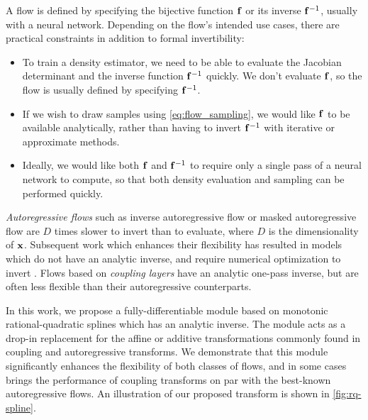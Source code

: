 A flow is defined by specifying the bijective function $\mathbf{f}$ or its inverse $\mathbf{f}^{-1}$, usually with a neural network. Depending on the flow's intended use cases, there are practical constraints in addition to formal invertibility:
\begin{itemize}[leftmargin=*, topsep=0pt, itemsep=0pt]
    \item To train a density estimator, we need to be able to evaluate the Jacobian determinant and the inverse function $\mathbf{f}^{-1}$ quickly. We don't evaluate $\mathbf{f}$, so the flow is usually defined by specifying $\mathbf{f}^{-1}$.
    \item If we wish to draw samples using \cref{eq:flow_sampling}, we would like $\mathbf{f}$ to be available analytically, rather than having to invert $\mathbf{f}^{-1}$ with iterative or approximate methods.
    \item Ideally, we would like both $ \mathbf{f} $ and $ \mathbf{f}^{-1} $ to require only a single pass of a neural network to compute, so that both density evaluation and sampling can be performed quickly.
\end{itemize}
\emph{Autoregressive flows} such as inverse autoregressive flow \citep[IAF,][]{Kingma:2016:iaf} or masked autoregressive flow \citep[MAF,][]{Papamakarios:2017:maf} are $ D $ times slower to invert than to evaluate, where $ D $ is the dimensionality of $ \mathbf{x} $.
Subsequent work which enhances their flexibility has resulted in models which do not have an analytic inverse, and require numerical optimization to invert \citep{Huang:2018:naf}.
Flows based on \emph{coupling layers} \cite[NICE, RealNVP,][]{Dinh:2015:nice, Dinh:2017:rnvp} have an analytic one-pass inverse, but are often less flexible than their autoregressive counterparts. 

In this work, we propose a fully-differentiable module based on monotonic rational-quadratic splines which has an analytic inverse. 
The module acts as a drop-in replacement for the affine or additive transformations commonly found in coupling and autoregressive transforms. 
We demonstrate that this module significantly enhances the flexibility of both classes of flows, and in some cases brings the performance of coupling transforms on par with the best-known autoregressive flows. 
An illustration of our proposed transform is shown in \cref{fig:rq-spline}.

